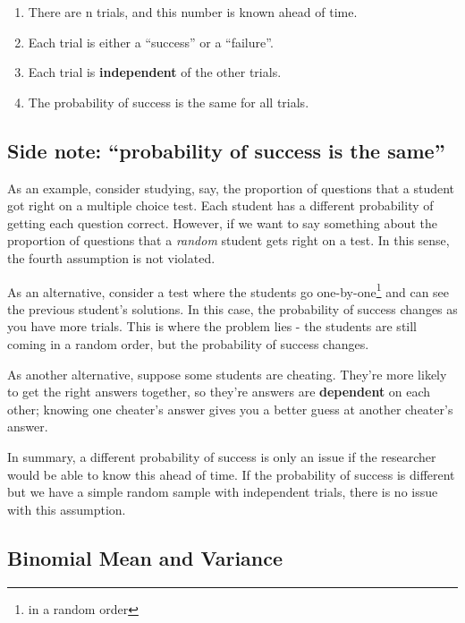 \documentclass[
  letterpaper,
  DIV=11,
  numbers=noendperiod,
  oneside]{scrreprt}
\providecommand{\tightlist}{%
  \setlength{\itemsep}{0pt}\setlength{\parskip}{0pt}}\usepackage{longtable,booktabs,array}
\begin{document}
\begin{enumerate}
\def\labelenumi{\arabic{enumi}.}
\tightlist
\item
  There are n trials, and this number is known ahead of time.
\item
  Each trial is either a ``success'' or a ``failure''.
\item
  Each trial is \textbf{independent} of the other trials.
\item
  The probability of success is the same for all trials.
\end{enumerate}

\hypertarget{side-note-probability-of-success-is-the-same}{%
\subsection{Side note: ``probability of success is the
same''}\label{side-note-probability-of-success-is-the-same}}

As an example, consider studying, say, the proportion of questions that
a student got right on a multiple choice test. Each student has a
different probability of getting each question correct. However, if we
want to say something about the proportion of questions that a
\emph{random} student gets right on a test. In this sense, the fourth
assumption is not violated.

As an alternative, consider a test where the students go
one-by-one\footnote{in a random order} and can see the previous
student's solutions. In this case, the probability of success changes as
you have more trials. This is where the problem lies - the students are
still coming in a random order, but the probability of success changes.

As another alternative, suppose some students are cheating. They're more
likely to get the right answers together, so they're answers are
\textbf{dependent} on each other; knowing one cheater's answer gives you
a better guess at another cheater's answer.

In summary, a different probability of success is only an issue if the
researcher would be able to know this ahead of time. If the probability
of success is different but we have a simple random sample with
independent trials, there is no issue with this assumption.

\hypertarget{binomial-mean-and-variance}{%
\subsection{Binomial Mean and
Variance}\label{binomial-mean-and-variance}}
\end{document}
